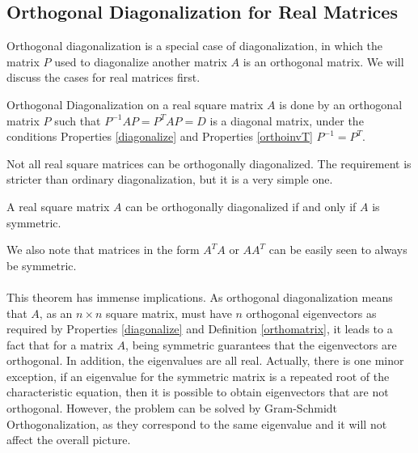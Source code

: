 \subsection{Orthogonal Diagonalization for Real Matrices}
\label{orthogonaldiagreal}

Orthogonal diagonalization is a special case of diagonalization, in which the matrix $P$ used to diagonalize another matrix $A$ is an orthogonal matrix. We will discuss the cases for real matrices first.
\begin{defn}
\label{orthodiagonal}
Orthogonal Diagonalization on a real square matrix $A$ is done by an orthogonal matrix $P$ such that $P^{-1}AP = P^TAP = D$ is a diagonal matrix, under the conditions Properties \ref{diagonalize} and Properties \ref{orthoinvT} $P^{-1} = P^T$.
\end{defn}

Not all real square matrices can be orthogonally diagonalized. The requirement is stricter than ordinary diagonalization, but it is a very simple one.
\begin{thm}
\label{symdiag}
A real square matrix $A$ can be orthogonally diagonalized if and only if $A$ is symmetric.
\end{thm}
We also note that matrices in the form $A^TA$ or $AA^T$ can be easily seen to always be symmetric.\\
\\
This theorem has immense implications. As orthogonal diagonalization means that $A$, as an $n \times n$ square matrix, must have $n$ orthogonal eigenvectors as required by Properties \ref{diagonalize} and Definition \ref{orthomatrix}, it leads to a fact that for a matrix $A$, being symmetric guarantees that the eigenvectors are orthogonal. In addition, the eigenvalues are all real. Actually, there is one minor exception, if an eigenvalue for the symmetric matrix is a repeated root of the characteristic equation, then it is possible to obtain eigenvectors that are not orthogonal. However, the problem can be solved by Gram-Schmidt Orthogonalization, as they correspond to the same eigenvalue and it will not affect the overall picture.
